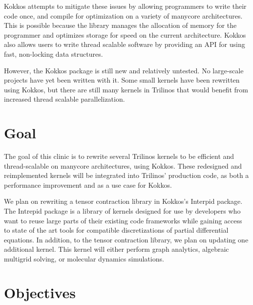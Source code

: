 \documentclass[proposal]{hmcclinic}
\begin{document}
Kokkos attempts to mitigate these issues by allowing programmers to
write their code once, and compile for optimization on a variety of
manycore architectures.  This is possible because the library manages the
allocation of memory for the programmer and optimizes storage for speed on
the current architecture. Kokkos also allows users to write thread scalable
software by providing an API for using fast, non-locking data structures. 

However, the Kokkos package is still new and relatively untested.  No
large-scale projects have yet been written with it.  Some small kernels
have been rewritten using Kokkos, but there are still many kernels in Trilinos
that would benefit from increased thread scalable parallelization. 


\section{Goal}

The goal of this clinic is to rewrite several Trilinos kernels to be efficient
and thread-scalable on manycore architectures, using Kokkos.  These redesigned
and reimplemented kernels will be integrated into Trilinos' production code, as
both a performance improvement and as a use case for Kokkos.

We plan on rewriting a tensor contraction library in Kokkos's Interpid package. The 
Intrepid package is a library of kernels designed for use by developers who want to 
reuse large parts of their existing code frameworks while gaining access to state of the
art tools for compatible discretizations of partial differential equations. In addition, 
to the tensor contraction library, we plan on updating one additional kernel. This kernel 
will either perform graph analytics, algebraic multigrid solving, or molecular dynamics 
simulations. 
\section{Objectives}
\end{document}
